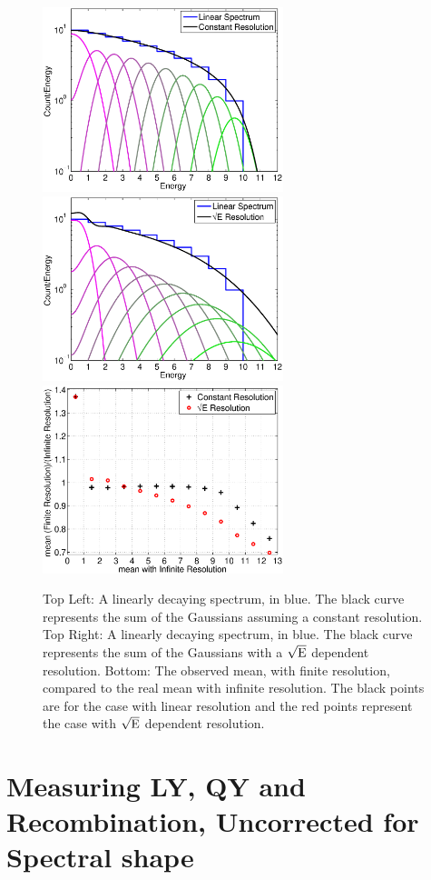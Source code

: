  \begin{figure}[h!]\centering
\includegraphics[width=70mm]{Recombination_LY_QY/Figures/Toy_Model_lin_const}
\includegraphics[width=70mm]{Recombination_LY_QY/Figures/Toy_Model_lin_dep}
\includegraphics[width=70mm]{Recombination_LY_QY/Figures/Toy_Model_mean_shift}
\caption{Top Left: A linearly decaying spectrum, in blue. The black curve represents the sum of the Gaussians assuming a constant resolution. Top Right: A linearly decaying spectrum, in blue. The black curve represents the sum of the Gaussians with a $\rm \sqrt{E}$ dependent resolution. Bottom: The observed mean, with finite resolution, compared to the real mean with infinite resolution. The black points are for the case with linear resolution and the red points represent the case with $\rm \sqrt{E}$ dependent resolution.}
\label{fig:Toy_Linear}
\end{figure}


\section{Measuring LY, QY and Recombination, Uncorrected for Spectral shape}

